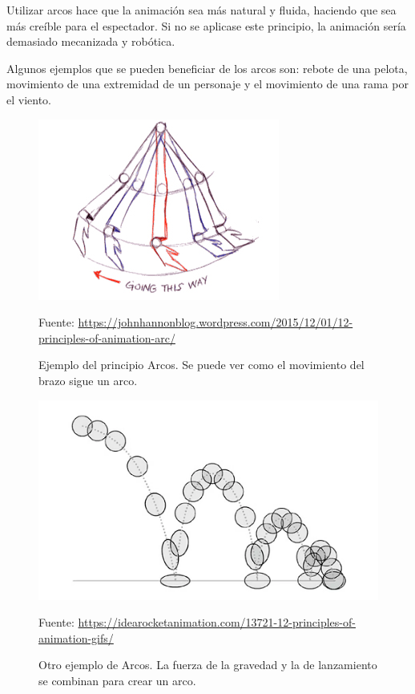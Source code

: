 \documentclass{article}
\begin{document}
\bigskip

Utilizar arcos hace que la animación sea más natural y fluida, haciendo que sea más creíble para el espectador. Si no se aplicase este principio, la animación sería demasiado mecanizada y robótica.

\bigskip

Algunos ejemplos que se pueden beneficiar de los arcos son: rebote de una pelota, movimiento de una extremidad de un personaje y el movimiento de una rama por el viento.

\begin{figure}[H]
    \centering
    \includegraphics[width=\textwidth]{imagenes/arm-arc.jpg}
    \caption{Ejemplo del principio Arcos. Se puede ver como el movimiento del brazo sigue un arco.}
    \vspace{10pt}
    \footnotesize{Fuente: \url{https://johnhannonblog.wordpress.com/2015/12/01/12-principles-of-animation-arc/}}
\end{figure}

\begin{figure}[H]
    \centering
    \includegraphics[width=\textwidth]{imagenes/bouncing-ball.png}
    \caption{Otro ejemplo de Arcos. La fuerza de la gravedad y la de lanzamiento se combinan para crear un arco.}
    \vspace{10pt}
    \footnotesize{Fuente: \url{https://idearocketanimation.com/13721-12-principles-of-animation-gifs/}}
\end{figure}
\end{document}
